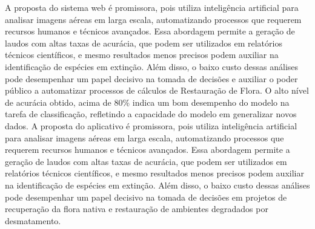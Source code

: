 A proposta do sistema web é promissora, pois utiliza inteligência artificial para analisar imagens aéreas em larga escala, automatizando processos que requerem recursos humanos e técnicos avançados.
Essa abordagem permite a geração de laudos com altas taxas de acurácia, que podem ser utilizados em relatórios técnicos científicos, e mesmo resultados menos precisos podem auxiliar na identificação de espécies em extinção. Além disso, o baixo custo dessas análises pode desempenhar um papel decisivo na tomada de decisões e auxiliar o poder público a automatizar processos de cálculos de Restauração de Flora.
O alto nível de acurácia obtido, acima de 80\% indica um bom desempenho do modelo na tarefa de classificação, refletindo a capacidade do modelo em generalizar novos dados.
A proposta do aplicativo é promissora, pois utiliza inteligência artificial para analisar imagens aéreas em larga escala, automatizando processos que requerem recursos humanos e técnicos avançados. Essa abordagem permite a geração de laudos com altas taxas de acurácia, que podem ser utilizados em relatórios técnicos científicos, e mesmo resultados menos precisos podem auxiliar na identificação de espécies em extinção. Além disso, o baixo custo dessas análises pode desempenhar um papel decisivo na tomada de decisões em projetos de recuperação da flora nativa e restauração de ambientes degradados por desmatamento.